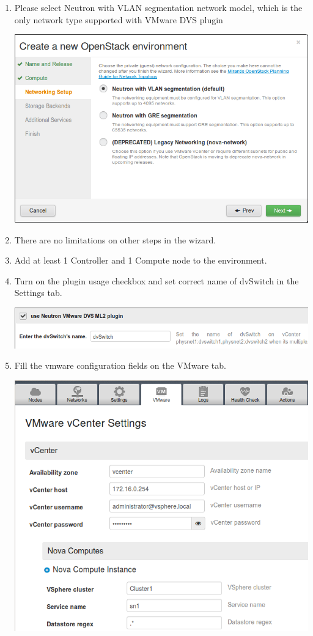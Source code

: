\documentclass{article}
\begin{document}
\begin{enumerate}
\item Please select Neutron with VLAN segmentation network model, which is the only network type supported with VMware DVS plugin

\includegraphics[scale=0.75]{pics/net}

\item There are no limitations on other steps in the wizard.

\item Add at least 1 Controller and 1 Compute node to the environment.

\item Turn on the plugin usage checkbox and set correct name of dvSwitch in the Settings tab.

\includegraphics[scale=0.75]{pics/settings}

\newpage

\item Fill the vmware configuration fields on the VMware tab.

\includegraphics[scale=0.75]{pics/vmware}


\end{enumerate}
\end{document}
